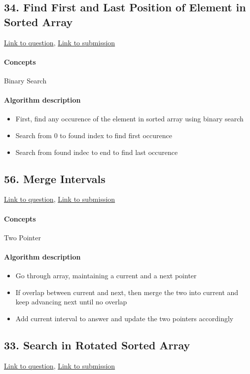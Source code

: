 \documentclass[11pt]{book}
\begin{document}
\subsection{34. Find First and Last Position of Element in Sorted Array}
\href{https://leetcode.com/problems/find-first-and-last-position-of-element-in-sorted-array/}{Link to question},
\href{https://leetcode.com/submissions/detail/339891358/}{Link to submission}
\paragraph{Concepts}
Binary Search
\paragraph{Algorithm description}
\begin{itemize}
    \item First, find any occurence of the element in sorted array using binary search
    \item Search from 0 to found index to find first occurence
    \item Search from found indec to end to find last occurence
\end{itemize}

\subsection{56. Merge Intervals}
\href{https://leetcode.com/problems/merge-intervals/}{Link to question},
\href{https://leetcode.com/submissions/detail/340117441/}{Link to submission}
\paragraph{Concepts}
Two Pointer
\paragraph{Algorithm description}
\begin{itemize}
    \item Go through array, maintaining a current and a next pointer
    \item If overlap between current and next, then merge the two into current and keep advancing next until no overlap
    \item Add current interval to answer and update the two pointers accordingly
\end{itemize}

\subsection{33. Search in Rotated Sorted Array}
\href{https://leetcode.com/problems/search-in-rotated-sorted-array/}{Link to question},
\href{https://leetcode.com/submissions/detail/340133304/}{Link to submission}
\end{document}

